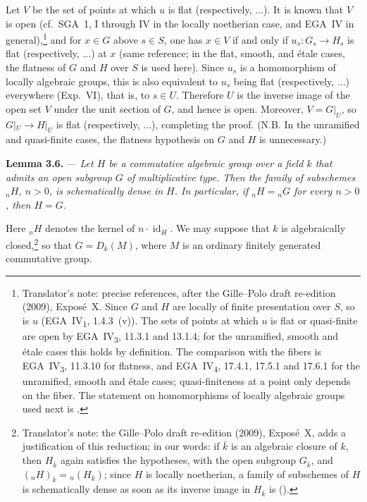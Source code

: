 Let \(V\) be the set of points at which \(u\) is flat (respectively,
\(\ldots\)). It is known that \(V\) is open (cf.\ SGA~1, I through IV
in the locally noetherian case, and EGA~IV in
general),\footnote{Translator's note: precise references, after the
Gille--Polo draft re-edition (2009), Expos\'e~X. Since \(G\) and \(H\)
are locally of finite presentation over \(S\), so is \(u\)
(EGA~IV\textsubscript{1}, 1.4.3~(v)). The sets of points at which \(u\)
is flat or quasi-finite are open by EGA~IV\textsubscript{3}, 11.3.1 and
13.1.4; for the unramified, smooth and \'etale cases this holds by
definition. The comparison with the fibers is EGA~IV\textsubscript{3},
11.3.10 for flatness, and EGA~IV\textsubscript{4}, 17.4.1, 17.5.1 and
17.6.1 for the unramified, smooth and \'etale cases; quasi-finiteness at
a point only depends on the fiber. The statement on homomorphisms of
locally algebraic groups used next is
.} and
for \(x\in G\) above \(s\in S\), one has \(x\in V\) if and only if
\(u_s:G_s\to H_s\) is flat (respectively, \(\ldots\)) at \(x\)
(same reference; in the flat, smooth, and étale cases, the flatness of
\(G\) and \(H\) over \(S\) is used here). Since \(u_s\) is a
homomorphism of locally algebraic groups, this is also equivalent to
\(u_s\) being flat (respectively, \(\ldots\)) everywhere
(Exp.~VI), that is, to \(s\in U\).
Therefore \(U\) is the inverse image of the open set \(V\) under the
unit section of \(G\), and hence is open. Moreover, \(V=G|_U\), so
\(G|_U\to H|_U\) is flat (respectively, \(\ldots\)), completing the
proof. (N.B. In the unramified and quasi-finite cases, the flatness
hypothesis on \(G\) and \(H\) is unnecessary.)

\medskip
\noindent{}\textbf{Lemma 3.6.} ---
\textit{Let \(H\) be a commutative algebraic group over a field \(k\)
that admits an open subgroup \(G\) of multiplicative type. Then the
family of subschemes \({}_nH\), \(n>0\), is schematically dense in
\(H\). In particular, if \({}_nH={}_nG\) for every \(n>0\), then
\(H=G\).}

Here \({}_nH\) denotes the kernel of
\(n\cdot\operatorname{id}_H\). We may suppose that \(k\) is
algebraically closed,\footnote{Translator's note: the Gille--Polo draft
re-edition (2009), Expos\'e~X, adds a justification of this reduction;
in our words: if \(\bar k\) is an algebraic closure of \(k\), then
\(H_{\bar k}\) again satisfies the hypotheses, with the open subgroup
\(G_{\bar k}\), and \(({}_nH)_{\bar k}={}_n(H_{\bar k})\); since \(H\) is
locally noetherian, a family of subschemes of \(H\) is schematically
dense as soon as its inverse image in \(H_{\bar k}\) is
().} so that \(G=D_k(M)\), where \(M\) is an ordinary
finitely generated commutative group.

